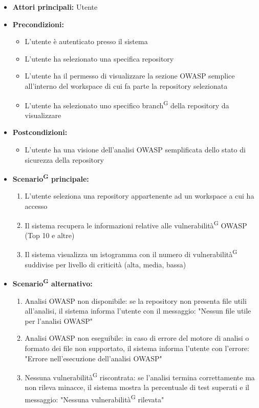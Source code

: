 \documentclass[a4paper, 11pt]{article}
\begin{document}
\begin{itemize}
	\item \textbf{Attori principali:} Utente
	\item \textbf{Precondizioni:}
    \begin{itemize}
        \item L'utente è autenticato presso il sistema
        \item L’utente ha selezionato una specifica repository
        \item L’utente ha il permesso di visualizzare la sezione OWASP semplice all’interno del workspace di cui fa parte la repository selezionata
        \item L’utente ha selezionato uno specifico branch\textsuperscript{G} della repository da visualizzare
    \end{itemize}
	\item \textbf{Postcondizioni:}
    \begin{itemize}
    \item L’utente ha una visione dell’analisi OWASP semplificata dello stato di sicurezza della repository
    \end{itemize}
	\item \textbf{Scenario\textsuperscript{G} principale:}
	\begin{enumerate}
		\item L’utente seleziona una repository appartenente ad un workspace a cui ha accesso
		\item Il sistema recupera le informazioni relative alle vulnerabilità\textsuperscript{G} OWASP (Top 10 e altre)
        \item Il sistema visualizza un istogramma con il numero di vulnerabilità\textsuperscript{G} suddivise per livello di criticità (alta, media, bassa)
	\end{enumerate}
    \item \textbf{Scenario\textsuperscript{G} alternativo:}
	\begin{enumerate}
		\item Analisi OWASP non disponibile: se la repository non presenta file utili all'analisi, il sistema informa l'utente con il messaggio: "Nessun file utile per l'analisi OWASP"
		\item Analisi OWASP non eseguibile: in caso di errore del motore di analisi o formato dei file non supportato, il sistema informa l'utente con l'errore: "Errore nell'esecuzione dell'analisi OWASP"
		\item Nessuna vulnerabilità\textsuperscript{G} riscontrata: se l'analisi termina correttamente ma non rileva minacce, il sistema mostra la percentuale di test superati e il messaggio: "Nessuna vulnerabilità\textsuperscript{G} rilevata"
	\end{enumerate}
\end{itemize}
\end{document}
